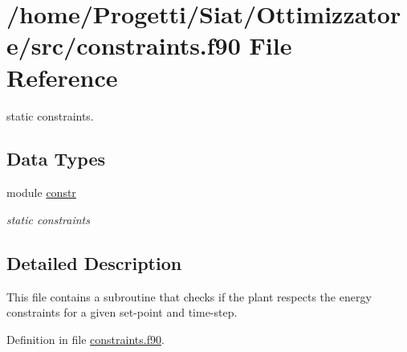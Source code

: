\hypertarget{constraints_8f90}{\section{/home/\-Progetti/\-Siat/\-Ottimizzatore/src/constraints.f90 File Reference}
\label{constraints_8f90}
}


static constraints.  


\subsection*{Data Types}
\begin{DoxyCompactItemize}
\item 
module \hyperlink{classconstr}{constr}
\begin{DoxyCompactList}\small\item\em static constraints \end{DoxyCompactList}\end{DoxyCompactItemize}


\subsection{Detailed Description}
This file contains a subroutine that checks if the plant respects the energy constraints for a given set-\/point and time-\/step. 

Definition in file \hyperlink{constraints_8f90_source}{constraints.\-f90}.

